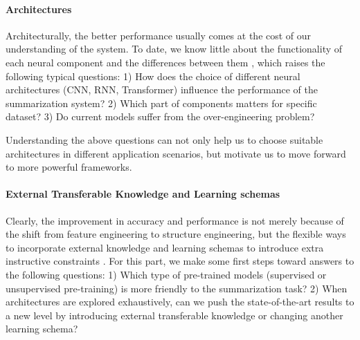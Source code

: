 \documentclass[11pt,a4paper]{article}
\begin{document}
\paragraph{Architectures} Architecturally, the better performance usually comes at the cost of our understanding of the system.
To date, we know little about the functionality of each neural component and the differences between them \cite{peters2018dissecting}, which raises the following typical questions:
1) How does the choice of different neural architectures (CNN, RNN, Transformer) influence the performance of the summarization system?
    2) Which part of components matters for specific dataset?
    3) Do current models suffer from the over-engineering problem?


Understanding the above questions can not only help us to choose suitable architectures in different application scenarios, but motivate us to move forward to more powerful frameworks.



\paragraph{External Transferable Knowledge and Learning schemas} Clearly, the improvement in accuracy and performance is not merely because of the shift from feature engineering to structure engineering, but the flexible ways to incorporate external knowledge \cite{mikolov2013efficient,peters2018deep,devlin2018bert} and learning schemas to introduce extra instructive constraints \cite{paulus2017deep,arumae2018reinforced}.
For this part, we make some first steps toward answers to the following questions:
    1) Which type of pre-trained models (supervised or unsupervised pre-training) is more friendly to the summarization task?
    2) When architectures are explored exhaustively, can we push the state-of-the-art results to a new level by introducing external transferable knowledge or changing another learning schema?
\end{document}
